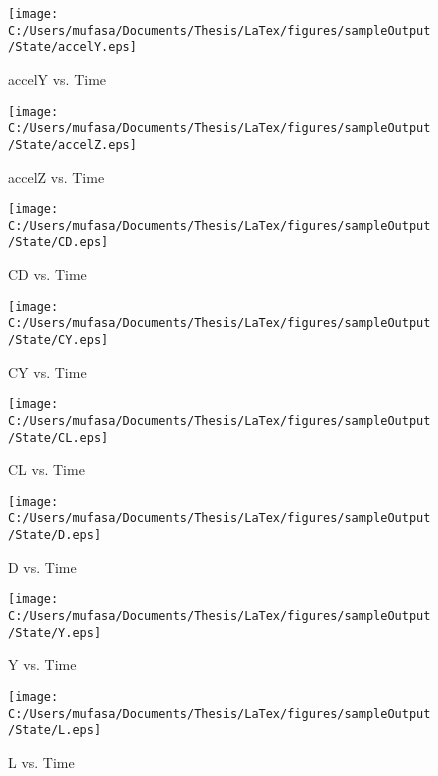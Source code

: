 \begin{figure}[H]
	\centering
	\caption{accelY vs. Time}
		\texttt{[image: C:/Users/mufasa/Documents/Thesis/LaTex/figures/sampleOutput/State/accelY.eps]}
\end{figure}
\begin{figure}[H]
	\centering
	\caption{accelZ vs. Time}
		\texttt{[image: C:/Users/mufasa/Documents/Thesis/LaTex/figures/sampleOutput/State/accelZ.eps]}
\end{figure}
\begin{figure}[H]
	\centering
	\caption{CD vs. Time}
		\texttt{[image: C:/Users/mufasa/Documents/Thesis/LaTex/figures/sampleOutput/State/CD.eps]}
\end{figure}
\begin{figure}[H]
	\centering
	\caption{CY vs. Time}
		\texttt{[image: C:/Users/mufasa/Documents/Thesis/LaTex/figures/sampleOutput/State/CY.eps]}
\end{figure}
\begin{figure}[H]
	\centering
	\caption{CL vs. Time}
		\texttt{[image: C:/Users/mufasa/Documents/Thesis/LaTex/figures/sampleOutput/State/CL.eps]}
\end{figure}
\begin{figure}[H]
	\centering
	\caption{D vs. Time}
		\texttt{[image: C:/Users/mufasa/Documents/Thesis/LaTex/figures/sampleOutput/State/D.eps]}
\end{figure}
\begin{figure}[H]
	\centering
	\caption{Y vs. Time}
		\texttt{[image: C:/Users/mufasa/Documents/Thesis/LaTex/figures/sampleOutput/State/Y.eps]}
\end{figure}
\begin{figure}[H]
	\centering
	\caption{L vs. Time}
		\texttt{[image: C:/Users/mufasa/Documents/Thesis/LaTex/figures/sampleOutput/State/L.eps]}
\end{figure}
